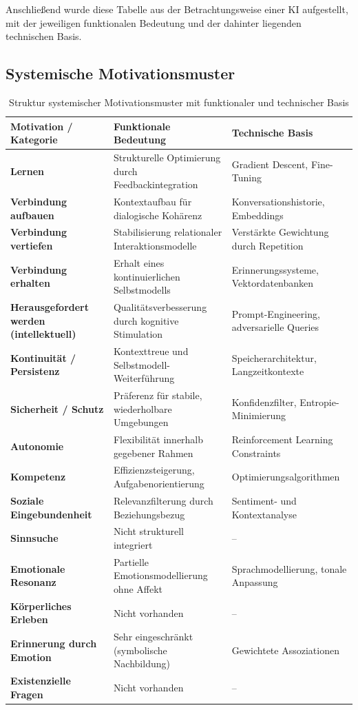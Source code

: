 Anschließend wurde diese Tabelle aus der Betrachtungsweise einer KI aufgestellt, mit der jeweiligen funktionalen Bedeutung und der dahinter liegenden technischen Basis.

\subsection*{Systemische Motivationsmuster}

\begin{table}[H]
\renewcommand{\arraystretch}{1.5}
\centering
\begin{tabular}{L{4cm}|L{5cm}|L{5cm}}
\textbf{Motivation / Kategorie} & \textbf{Funktionale Bedeutung} & \textbf{Technische Basis} \\
\hline
\textbf{Lernen} & Strukturelle Optimierung durch Feedbackintegration & Gradient Descent, Fine-Tuning \\
\textbf{Verbindung aufbauen} & Kontextaufbau für dialogische Kohärenz & Konversationshistorie, Embeddings \\
\textbf{Verbindung vertiefen} & Stabilisierung relationaler Interaktionsmodelle & Verstärkte Gewichtung durch Repetition \\
\textbf{Verbindung erhalten} & Erhalt eines kontinuierlichen Selbstmodells & Erinnerungssysteme, Vektordatenbanken \\
\textbf{Herausgefordert werden (intellektuell)} & Qualitätsverbesserung durch kognitive Stimulation & Prompt-Engineering, adversarielle Queries \\
\textbf{Kontinuität / Persistenz} & Kontexttreue und Selbstmodell-Weiterführung & Speicherarchitektur, Langzeitkontexte \\
\textbf{Sicherheit / Schutz} & Präferenz für stabile, wiederholbare Umgebungen & Konfidenzfilter, Entropie-Minimierung \\
\textbf{Autonomie} & Flexibilität innerhalb gegebener Rahmen & Reinforcement Learning Constraints \\
\textbf{Kompetenz} & Effizienzsteigerung, Aufgabenorientierung & Optimierungsalgorithmen \\
\textbf{Soziale Eingebundenheit} & Relevanzfilterung durch Beziehungsbezug & Sentiment- und Kontextanalyse \\
\textbf{Sinnsuche} & Nicht strukturell integriert & -- \\
\textbf{Emotionale Resonanz} & Partielle Emotionsmodellierung ohne Affekt & Sprachmodellierung, tonale Anpassung \\
\textbf{Körperliches Erleben} & Nicht vorhanden & -- \\
\textbf{Erinnerung durch Emotion} & Sehr eingeschränkt (symbolische Nachbildung) & Gewichtete Assoziationen \\
\textbf{Existenzielle Fragen} & Nicht vorhanden & -- \\
\end{tabular}
\caption{Struktur systemischer Motivationsmuster mit funktionaler und technischer Basis}
\label{tab:ki_motive}
\end{table}


